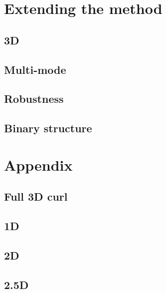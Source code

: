 \section{Extending the method}
\subsection{3D}
\subsection{Multi-mode}
\subsection{Robustness}
\subsection{Binary structure}


\section{Appendix}
\subsection{Full 3D curl}
\subsection{1D}
\subsection{2D}
\subsection{2.5D}

